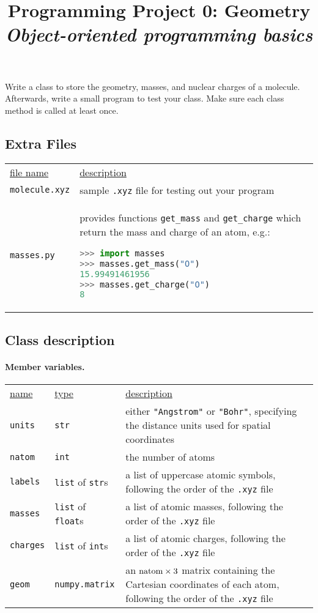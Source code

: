\documentclass[fleqn]{article}
\title{Programming Project 0: Geometry\\
\textit{Object-oriented programming basics}}
\author{}
\date{}
\newcommand{\linl}[1]{\lstinline{#1}{}}
\newcommand{\ul}[1]{\underline{#1}}
\begin{document}
\maketitle
\vspace{-1cm}
\noindent
Write a class to store the geometry, masses, and nuclear charges of a molecule.
Afterwards, write a small program to test your class.
Make sure each class method is called at least once.

\subsection*{Extra Files}
\begin{center}
\begin{tabular}{p{}@{}p{}}
  \ul{file name} & \ul{description} \\
  \linl{molecule.xyz}
  & sample \linl{.xyz} file for testing out your program \\ 
  \linl{masses.py}
  & provides functions \linl{get_mass} and \linl{get_charge} which return the mass and charge of an atom, e.g.:
  \begin{lstlisting}[language=python]
>>> import masses
>>> masses.get_mass("O")
15.99491461956
>>> masses.get_charge("O")
8
\end{lstlisting}
\end{tabular}
\end{center}

\subsection*{Class description}

\paragraph{Member variables.}
\begin{center}
\begin{tabular}{p{}@{}p{}@{}p{}}
  \ul{name} & \ul{type} & \ul{description} \\
  \linl{units}   & \linl{str}
  & either \linl{"Angstrom"} or \linl{"Bohr"}, specifying the distance units used for spatial coordinates\\
  \linl{natom}   & \linl{int}
  & the number of atoms\\
  \linl{labels}  & \linl{list} of \linl{str}s
  & a list of uppercase atomic symbols, following the order of the \linl{.xyz} file\\
  \linl{masses}  & \linl{list} of \linl{float}s
  & a list of atomic masses, following the order of the \linl{.xyz} file\\
  \linl{charges} & \linl{list} of \linl{int}s
  & a list of atomic charges, following the order of the \linl{.xyz} file\\
  \linl{geom}    & \linl{numpy.matrix}
  & an $\text{\linl{natom}}\times3$ matrix containing the Cartesian coordinates of each atom, following the order of the \linl{.xyz} file
\end{tabular}
\end{center}
\end{document}
